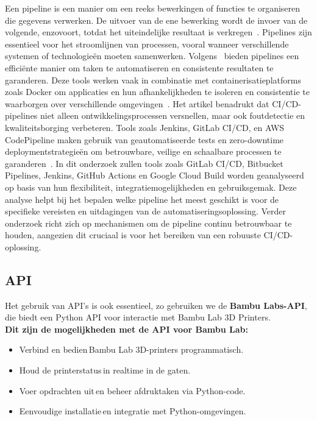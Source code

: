 Een pipeline is een manier om een reeks bewerkingen of functies te organiseren die gegevens verwerken. De uitvoer van de ene bewerking wordt de invoer van de volgende, enzovoort, totdat het uiteindelijke resultaat is verkregen~\autocite{pythonPipelinesThakur}. Pipelines zijn essentieel voor het stroomlijnen van processen, vooral wanneer verschillende systemen of technologieën moeten samenwerken. Volgens~\autocite{thesusVirtanen} bieden pipelines een efficiënte manier om taken te automatiseren en consistente resultaten te garanderen. Deze tools werken vaak in combinatie met containerisatieplatforms zoals Docker om applicaties en hun afhankelijkheden te isoleren en consistentie te waarborgen over verschillende omgevingen~\autocite{ijrasetCICDPipeline}. Het artikel benadrukt dat CI/CD-pipelines niet alleen ontwikkelingsprocessen versnellen, maar ook foutdetectie en kwaliteitsborging verbeteren. Tools zoals Jenkins, GitLab CI/CD, en AWS CodePipeline maken gebruik van geautomatiseerde tests en zero-downtime deploymentstrategieën om betrouwbare, veilige en schaalbare processen te garanderen~\autocite{ijrasetFileServe}. In dit onderzoek zullen tools zoals GitLab CI/CD, Bitbucket Pipelines, Jenkins, GitHub Actions en Google Cloud Build worden geanalyseerd op basis van hun flexibiliteit, integratiemogelijkheden en gebruiksgemak. Deze analyse helpt bij het bepalen welke pipeline het meest geschikt is voor de specifieke vereisten en uitdagingen van de automatiseringsoplossing. Verder onderzoek richt zich op mechanismen om de pipeline continu betrouwbaar te houden, aangezien dit cruciaal is voor het bereiken van een robuuste CI/CD-oplossing.

\subsection{API}%

Het gebruik van API’s is ook essentieel, zo gebruiken we de \textbf{Bambu Labs-API}, die biedt een Python API voor interactie met Bambu Lab 3D Printers.\\

\textbf{Dit zijn de mogelijkheden met de API voor Bambu Lab:}

\begin{itemize}
\item Verbind en bedien Bambu Lab 3D-printers programmatisch. 
\item Houd de printerstatus in realtime in de gaten. 
\item Voer opdrachten uit en beheer afdruktaken via Python-code. 
\item Eenvoudige installatie en integratie met Python\--omgevingen. 
\end{itemize}

